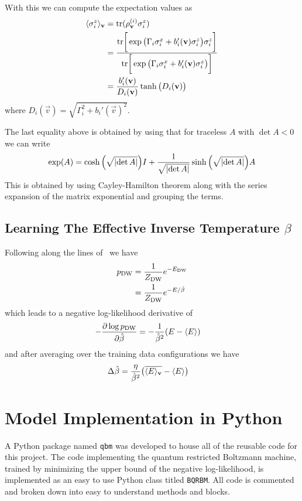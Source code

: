 With this we can compute the expectation values as
\begin{align}
    \langle \sigma_i^z \rangle_{\mathbf{v}}
        &= \text{tr}(\rho_{\mathbf{v}}^{(i)}\sigma_i^z) \\
        &= \frac{\text{tr}\bigg[ \exp \big(\Gamma_i \sigma_i^x + b_i'(\mathbf{v}) \sigma_i^z\big) \sigma_i^z \bigg]}{\text{tr}\bigg[ \exp \big(\Gamma_i \sigma_i^x + b_i'(\mathbf{v}) \sigma_i^z\big) \bigg]} \\
        &= \frac{b_i'(\mathbf{v})}{D_i(\mathbf{v})} \tanh\big(D_i(\mathbf{v})\big)
\end{align}
where \( D_i(\vec{v}) = \sqrt{\Gamma_i^2 + b_i'(\vec{v})^2} \).

The last equality above is obtained by using that for traceless \( A \) with \( \det A < 0 \) we can write
\begin{align}
    \exp(A) = \cosh\Big(\sqrt{\lvert\det A\rvert}\Big) I + \frac{1}{\sqrt{\lvert\det A\rvert}}\sinh\Big(\sqrt{\lvert\det A\rvert}\Big) A
\end{align}
This is obtained by using Cayley-Hamilton theorem along with the series expansion of the matrix exponential and grouping the terms.

\subsection{Learning The Effective Inverse Temperature \( \beta \)}\label{app:learning_beta}
Following along the lines of~\cite{xu_2021} we have
\begin{align}
    p_\text{DW}
        &= \frac{1}{Z_\text{DW}} e^{-E_\text{DW}} \\
        &= \frac{1}{Z_\text{DW}} e^{-E / \hat{\beta}} \\
\end{align}
which leads to a negative log-likelihood derivative of
\begin{align}
    -\frac{\partial \log p_\text{DW}}{\partial\hat{\beta}}
        &= -\frac{1}{\hat{\beta}^2} (E - \langle E \rangle)
\end{align}
and after averaging over the training data configurations we have
\begin{align}
    \Delta\hat{\beta}
        &= \frac{\eta}{\hat{\beta}^2}\big(\overline{\langle E \rangle_{\mathbf{v}}} - \langle E \rangle\big)
\end{align}

\section{Model Implementation in Python}
A Python package named \texttt{qbm} was developed to house all of the reusable code for this project.
The code implementing the quantum restricted Boltzmann machine, trained by minimizing the upper bound of the negative log-likelihood, is implemented as an easy to use Python class titled \texttt{BQRBM}.
All code is commented and broken down into easy to understand methods and blocks.

